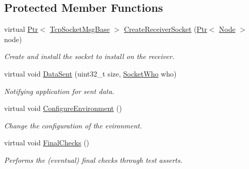 \subsection*{Protected Member Functions}
\begin{DoxyCompactItemize}
\item 
virtual \hyperlink{classns3_1_1Ptr}{Ptr}$<$ \hyperlink{classns3_1_1TcpSocketMsgBase}{Tcp\+Socket\+Msg\+Base} $>$ \hyperlink{classTcpDataSentCbTestCase_ad26dcec1cccd30a0dda2263a999e1e3a}{Create\+Receiver\+Socket} (\hyperlink{classns3_1_1Ptr}{Ptr}$<$ \hyperlink{classns3_1_1Node}{Node} $>$ node)
\begin{DoxyCompactList}\small\item\em Create and install the socket to install on the receiver. \end{DoxyCompactList}\item 
virtual void \hyperlink{classTcpDataSentCbTestCase_a1b8897db2944a99925528772abd9060d}{Data\+Sent} (uint32\+\_\+t size, \hyperlink{classns3_1_1TcpGeneralTest_a29338e6b7137cad650c2ff835713f6ee}{Socket\+Who} who)
\begin{DoxyCompactList}\small\item\em Notifying application for sent data. \end{DoxyCompactList}\item 
virtual void \hyperlink{classTcpDataSentCbTestCase_ad0bb6161988e738da82f61d7c60be9b6}{Configure\+Environment} ()
\begin{DoxyCompactList}\small\item\em Change the configuration of the evironment. \end{DoxyCompactList}\item 
virtual void \hyperlink{classTcpDataSentCbTestCase_a9245f22261d5ebb5c2dd9a687d6e226b}{Final\+Checks} ()
\begin{DoxyCompactList}\small\item\em Performs the (eventual) final checks through test asserts. \end{DoxyCompactList}\end{DoxyCompactItemize}
